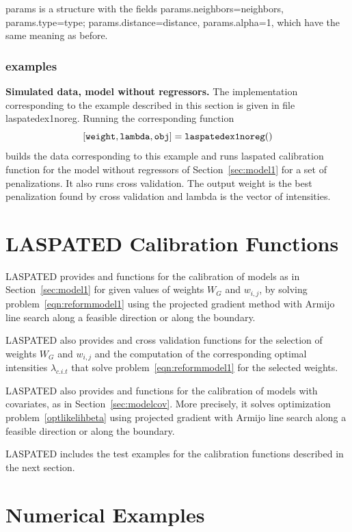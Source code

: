 \documentclass[article]{jss}
\begin{document}
{params is a structure
with the fields
params.neighbors=neighbors, params.type=type; params.distance=distance,
params.alpha=1, which have the same meaning as before.


\subsubsection[Matlab examples]{ examples}

\par {\textbf{Simulated data, model without regressors.}} The implementation corresponding to the example 
described in this section is  given in file laspatedex1noreg.
Running the corresponding function
$$
{\tt{[weight,lambda,obj]=laspatedex1noreg()}}
$$
builds the data corresponding to this example and runs laspated calibration function for the model without regressors of Section~\ref{sec:model1} for a set of penalizations.
It also runs cross validation.
The output weight is the best penalization found by cross validation and lambda is the vector of intensities.
}

\section{LASPATED Calibration Functions}
\label{sec:calib}

LASPATED provides  and  functions for the calibration of models as in Section~\ref{sec:model1} for given values of weights $W_{G}$ and $w_{i,j}$, by solving
problem~\eqref{eqn:reformmodel1} using the projected gradient method with Armijo line search along a feasible direction or along the boundary.

LASPATED also provides  and  cross validation functions for the selection of weights $W_{G}$ and $w_{i,j}$ and the computation of the corresponding optimal intensities
$\lambda_{c.i.t}$ that solve problem~\eqref{eqn:reformmodel1}
for the selected weights.

LASPATED also provides  and  functions for the
calibration of models with covariates, as in  Section~\ref{sec:modelcov}.
More precisely, it solves optimization problem~\eqref{optlikelihbeta} using projected gradient with Armijo line search along a feasible direction or along the boundary.

LASPATED includes the test examples for the calibration functions described in the next section.


\section{Numerical Examples}
\label{sec:examples}
\end{document}
